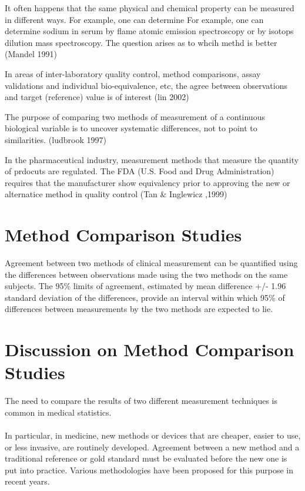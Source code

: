 \documentclass[12pt, a4paper]{report}
\theoremstyle{plain}
\theoremstyle{definition}
\theoremstyle{remark}
\begin{document}
	
	It often happens that the same physical and chemical property can be measured in different ways. For example, one can determine
	For example, one can determine sodium in serum by flame atomic emission spectroscopy or by isotops dilution mass spectroscopy. The question arises as to whcih methd is better (Mandel 1991)
	
	In areas of inter-laboratory quality control, method comparisons, assay validations and individual bio-equivalence, etc, the agree between observations and target (reference) value is
	of interest (lin 2002)
	
	The purpose of comparing two methods of measurement of a continuous biological variable is to uncover systematic differences, not to point to
	similarities. (ludbrook 1997)
	
	In the pharmaceutical industry, measurement methods that measure the quantity of prdocuts are regulated. The FDA (U.S. Food and
	Drug Administration) requires that the manufacturer show equivalency prior to approving the new or alternatice method in quality control (Tan \& Inglewicz ,1999)
	
	\section{Method Comparison Studies}
	
	Agreement between two methods of clinical measurement can be quantified using the differences between observations made using the two methods on the same subjects. The 95\% limits of agreement, estimated by mean difference +/- 1.96 standard deviation of the differences, provide an interval within which 95\% of differences between measurements by the two methods are expected to lie.
	
	\section{Discussion on Method Comparison Studies}
	
	The need to compare the results of two different measurement
	techniques is common in medical statistics.
	\\
	\\
	In particular, in medicine, new methods or devices that are
	cheaper, easier to use, or less invasive, are routinely developed.
	Agreement between a new method and a traditional reference or gold
	standard must be evaluated before the new one is put into
	practice. Various methodologies have been proposed for this
	purpose in recent years.
	
\end{document}

